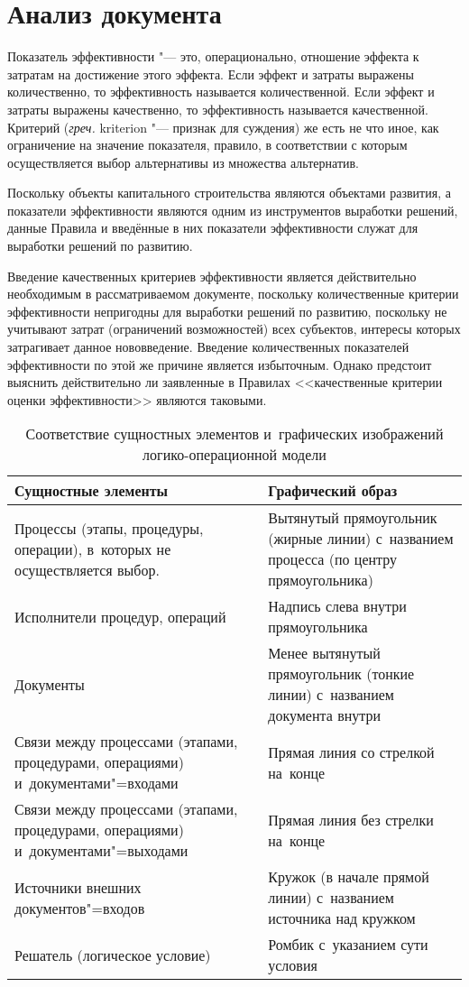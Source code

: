 \documentclass[a4paper, 12pt, numbers=enddot]{scrartcl}
\begin{document}
\section{Анализ документа}
Показатель эффективности "--- это, операционально, отношение эффекта к затратам
на достижение этого эффекта. Если эффект и затраты выражены количественно, то
эффективность называется количественной. Если эффект и затраты выражены
качественно, то эффективность называется качественной. Критерий (\textit{греч.}
kriterion "--- признак для суждения) же есть не что иное, как ограничение на
значение показателя, правило, в соответствии с которым осуществляется выбор
альтернативы из множества альтернатив.

Поскольку объекты капитального строительства являются объектами развития, а
показатели эффективности являются одним из инструментов выработки решений,
данные Правила и введённые в них показатели эффективности служат для выработки
решений по развитию.

Введение качественных критериев эффективности является действительно
необходимым в рассматриваемом документе, поскольку количественные критерии
эффективности непригодны для выработки решений по развитию, поскольку не
учитывают затрат (ограничений возможностей) всех субъектов, интересы которых
затрагивает данное нововведение. Введение количественных показателей
эффективности по этой же причине является избыточным. Однако предстоит выяснить
действительно ли заявленные в Правилах <<качественные критерии оценки
эффективности>> являются таковыми.

\begin{table}
  \centering\small
  \caption{Соответствие сущностных элементов и~графических изображений логико-операционной модели}
  \label{t:Legend}

  \begin{tabular}{p{22em}p{19em}}
    \toprule
    \textsf{Сущностные элементы} & \textsf{Графический образ} \\
    \midrule
    Процессы (этапы, процедуры, операции), в~которых не осуществляется выбор. &
	  Вытянутый прямоугольник (жирные линии) с~названием процесса (по
	  центру прямоугольника) \\
    Исполнители процедур, операций & Надпись слева внутри прямоугольника \\
    Документы & Менее вытянутый прямоугольник (тонкие линии) с~названием
	  документа внутри \\
    Связи между процессами (этапами, процедурами, операциями)
	  и~документами"=входами & Прямая линия со стрелкой на~конце \\
    Связи между процессами (этапами, процедурами, операциями)
	  и~документами"=выходами & Прямая линия без стрелки на~конце \\
    Источники внешних документов"=входов & Кружок (в начале прямой линии)
	  с~названием источника над кружком \\
    Решатель (логическое условие) & Ромбик с~указанием сути условия \\
    \bottomrule
  \end{tabular}
\end{table}
\end{document}
